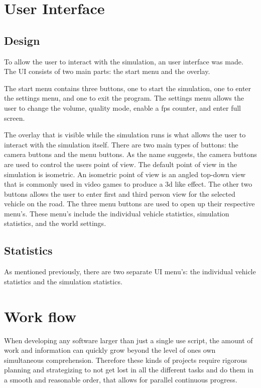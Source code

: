 \section{User Interface}

\subsection{Design}
    To allow the user to interact with the simulation, an user interface was made. The UI consists of two main parts: the start menu and the overlay. 

    The start menu contains three buttons, one to start the simulation, one to enter the settings menu, and one to exit the program. The settings menu allows the user to change the volume, quality mode, enable a fps counter, and enter full screen. 

    The overlay that is visible while the simulation runs is what allows the user to interact with the simulation itself. There are two main types of buttons: the camera buttons and the menu buttons. As the name suggests, the camera buttons are used to control the users point of view. The default point of view in the simulation is isometric. An isometric point of view is an angled top-down view that is commonly used in video games to produce a 3d like effect. The other two buttons allows the user to enter first and third person view for the selected vehicle on the road. The three menu buttons are used to open up their respective menu's. These menu's include the individual vehicle statistics, simulation statistics, and the world settings.

\subsection{Statistics}

    As mentioned previously, there are two separate UI menu's: the individual vehicle statistics and the simulation statistics. 


\section{Work flow}
    When developing any software larger than just a single use script, the amount of work and information can quickly grow beyond the level of ones own simultaneous comprehension. Therefore these kinds of projects require rigorous planning and strategizing to not get lost in all the different tasks and do them in a smooth and reasonable order, that allows for parallel continuous progress.

